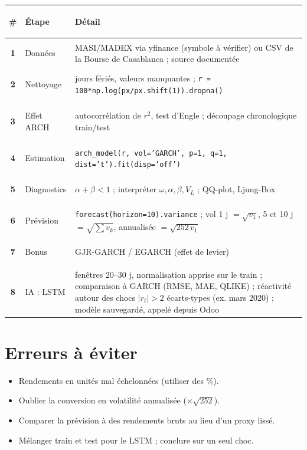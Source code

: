 \documentclass[10pt,a4paper]{article}
\begin{document}
\begin{tabularx}{\linewidth}{@{}>{\bfseries}c >{\bfseries\raggedright}p{2.6cm} X@{}}
\toprule
\# & Étape & Détail \\
\midrule
1 & Données & MASI/MADEX via yfinance (symbole à vérifier) ou CSV de la Bourse de Casablanca ; source documentée \\
2 & Nettoyage & jours fériés, valeurs manquantes ; \texttt{r = 100*np.log(px/px.shift(1)).dropna()} \\
3 & Effet ARCH & autocorrélation de $r^2$, test d'Engle ; découpage chronologique train/test \\
4 & Estimation & \texttt{arch\_model(r, vol='GARCH', p=1, q=1, dist='t').fit(disp='off')} \\
5 & Diagnostics & $\alpha+\beta<1$ ; interpréter $\omega,\alpha,\beta,V_L$ ; QQ-plot, Ljung-Box \\
6 & Prévision & \texttt{forecast(horizon=10).variance} ; vol 1 j $=\sqrt{v_1}$, 5 et 10 j $=\sqrt{\sum v_k}$, annualisée $=\sqrt{252\,v_1}$ \\
7 & Bonus & GJR-GARCH / EGARCH (effet de levier) \\
8 & IA : LSTM & fenêtres 20--30 j, normalisation apprise sur le train ; comparaison à GARCH (RMSE, MAE, QLIKE) ; réactivité autour des chocs $|r_t|>2$ écarts-types (ex. mars 2020) ; modèle sauvegardé, appelé depuis Odoo \\
\bottomrule
\end{tabularx}

\section{Erreurs à éviter}
\begin{itemize}
  \item Rendements en unités mal échelonnées (utiliser des \%).
  \item Oublier la conversion en volatilité annualisée ($\times\sqrt{252}$).
  \item Comparer la prévision à des rendements bruts au lieu d'un proxy lissé.
  \item Mélanger train et test pour le LSTM ; conclure sur un seul choc.
\end{itemize}
\end{document}
